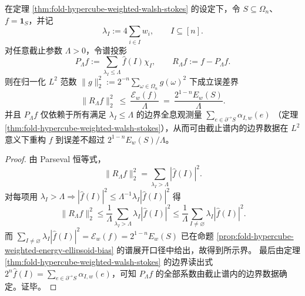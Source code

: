 \begin{theorem}\label{thm:fold-hypercube-walsh-stokes-energy-cutoff-reconstruction}
在定理 \ref{thm:fold-hypercube-weighted-walsh-stokes} 的设定下，令 \(S\subseteq\Omega_n\)、\(f=\mathbf 1_S\)，并记
\[
\lambda_I:=4\sum_{i\in I}w_i,\qquad I\subseteq[n].
\]
对任意截止参数 \(\Lambda>0\)，令谱投影
\[
P_{\Lambda}f:=\sum_{\lambda_I\le \Lambda}\widehat f(I)\chi_I,
\qquad
R_{\Lambda}f:=f-P_{\Lambda}f.
\]
则在归一化 \(L^2\) 范数 \(\|g\|_2^2:=2^{-n}\sum_{\omega\in\Omega_n}g(\omega)^2\) 下成立误差界
\[
\boxed{\;\|R_{\Lambda}f\|_2^2\ \le\ \frac{\mathcal E_w(f)}{\Lambda}\ =\ \frac{2^{1-n}E_w(S)}{\Lambda}.\;}
\]
并且 \(P_\Lambda f\) 仅依赖于所有满足 \(\lambda_I\le \Lambda\) 的边界全息观测量
\(
\sum_{e\in\partial^{\to}S}\alpha_{I,w}(e)
\)
（定理 \ref{thm:fold-hypercube-weighted-walsh-stokes}），从而可由截止谱内的边界数据在 \(L^2\) 意义下重构 \(f\) 到误差不超过 \(2^{1-n}E_w(S)/\Lambda\)。
\end{theorem}
\begin{proof}
由 Parseval 恒等式，
\[
\|R_{\Lambda}f\|_2^2=\sum_{\lambda_I>\Lambda}|\widehat f(I)|^2.
\]
对每项用 \(\lambda_I>\Lambda\Rightarrow |\widehat f(I)|^2\le \Lambda^{-1}\lambda_I|\widehat f(I)|^2\) 得
\[
\|R_{\Lambda}f\|_2^2
\le
\frac{1}{\Lambda}\sum_{\lambda_I>\Lambda}\lambda_I|\widehat f(I)|^2
\le
\frac{1}{\Lambda}\sum_{I\ne\varnothing}\lambda_I|\widehat f(I)|^2.
\]
而 \(\sum_{I\ne\varnothing}\lambda_I|\widehat f(I)|^2=\mathcal E_w(f)=2^{1-n}E_w(S)\) 已在命题 \ref{prop:fold-hypercube-weighted-energy-ellipsoid-bias} 的谱展开口径中给出，故得到所示界。
最后由定理 \ref{thm:fold-hypercube-weighted-walsh-stokes} 的边界读出式 \(2^n\widehat f(I)=\sum_{e\in\partial^{\to}S}\alpha_{I,w}(e)\)，可知 \(P_\Lambda f\) 的全部系数由截止谱内的边界数据确定。证毕。
\end{proof}



\endinput
